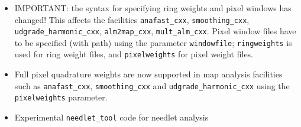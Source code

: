 \documentclass[12pt,twoside]{article}
\newcommand{\linklatexhtml}[3]{%
\latexhtml{\htmladdnormallink{#1}{#2}}{\htmladdnormallink{#1}{#3}}}
\begin{document}
%
\subsubsection[C++]{}
\begin{itemize}
\item IMPORTANT: the syntax for specifying ring weights and pixel windows has
  changed! This affects the facilities \texttt{anafast\_cxx}, \texttt{smoothing\_cxx},
  \texttt{udgrade\_harmonic\_cxx}, \texttt{alm2map\_cxx}, \texttt{mult\_alm\_cxx}.
  Pixel window files have to be specified (with path) using the parameter
  \texttt{windowfile}; \texttt{ringweights} is used for ring weight files, and \texttt{pixelweights}
  for pixel weight files.
\item Full pixel quadrature weights are now supported in map analysis facilities such as \texttt{anafast\_cxx}, \texttt{smoothing\_cxx} and \texttt{udgrade\_harmonic\_cxx}
  using the \texttt{pixelweights} parameter.
\item Experimental \texttt{needlet\_tool} code for needlet analysis
\end{itemize}

%
\end{document}
